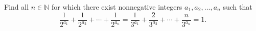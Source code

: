 Find all $n \in \mathbb{N}$ for which there exist nonnegative integers $a_1, a_2, \ldots, a_n$ such that
\[
\frac{1}{2^{a_1}} + \frac{1}{2^{a_2}} + \cdots + \frac{1}{2^{a_n}} = \frac{1}{3^{a_1}} + \frac{2}{3^{a_2}} + \cdots + \frac{n}{3^{a_n}} = 1.
\]
